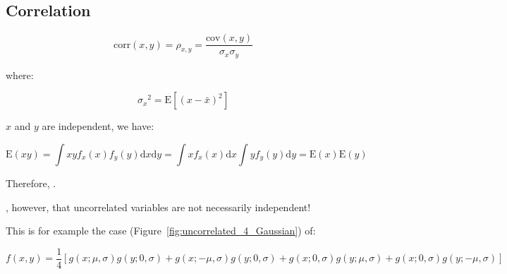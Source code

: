 \subsection{Correlation}
\label{subsec:corr}


\begin{equation}\label{eq:corr}
	\mathrm{corr}\left( x, y \right) = \rho_{x, y} = \frac{\mathrm{cov}\left( x, y \right)}{\sigma_{x} \sigma_{y}}
\end{equation} 

where:

\begin{equation}
	{\sigma_{x}}^{2} = \mathrm{E}\left[ (x - \bar{x})^{2} \right]
\end{equation}

 $x$ and $y$ are independent, we have:

\begin{equation}
	\mathrm{E}\left( xy \right) = \int {xy f_{x}(x) f_{y}(y)}\mathrm{d}x \mathrm{d}y 
	= \int {x f_{x}(x)}\mathrm{d}x \int {y f_{y}(y)}\mathrm{d}y 
	= \mathrm{E}\left( x \right) \mathrm{E}\left( y \right)
\end{equation}

Therefore, .

, however, that uncorrelated variables are not necessarily independent!

This is for example the case (Figure~\ref{fig:uncorrelated_4_Gaussian}) of:

\begin{equation}
	f(x, y) = \frac{1}{4} \left[ 
	g(x; \mu, \sigma) g(y; 0, \sigma) + g(x; -\mu, \sigma) g(y; 0, \sigma)
	+ g(x; 0, \sigma) g(y; \mu, \sigma) + g(x; 0, \sigma) g(y; -\mu, \sigma)
	\right]
\end{equation}

